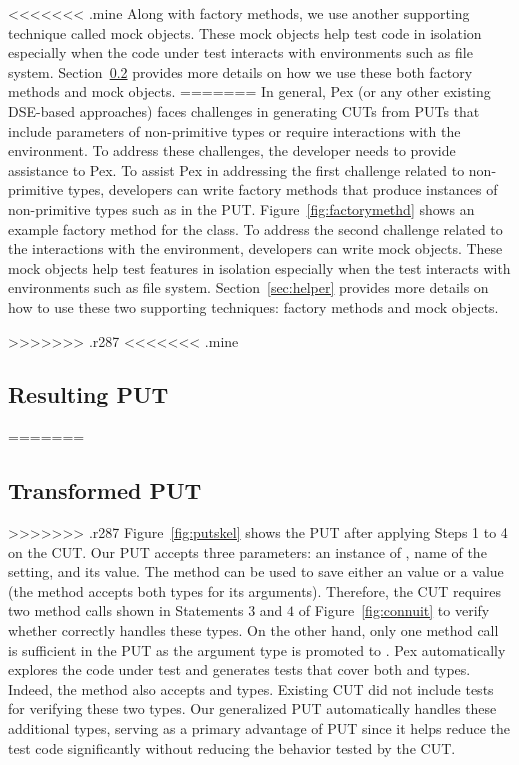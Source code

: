 <<<<<<< .mine
Along with factory methods, we use another supporting technique called mock objects. These mock objects help test code in isolation especially when the code under test interacts with environments such as file system. Section~\ref{} provides more details on how we use these both factory methods and mock objects.
=======
In general, Pex (or any other existing DSE-based approaches) faces challenges in generating CUTs from PUTs that include parameters of non-primitive types or require interactions with the environment. To address these challenges, the developer needs to provide assistance to Pex. To assist Pex in addressing the first challenge related to non-primitive types, developers can write factory methods that produce instances of non-primitive types such as  in the PUT. Figure~\ref{fig:factorymethd} shows an example factory method for the  class. To address the second challenge related to the interactions with the environment, developers can write mock objects. These mock objects help test features in isolation especially when the test interacts with environments such as file system. Section~\ref{sec:helper} provides more details on how to use these two supporting techniques: factory methods and mock objects.

>>>>>>> .r287
<<<<<<< .mine
\subsection{Resulting PUT}
=======
\subsection{Transformed PUT}

>>>>>>> .r287
Figure~\ref{fig:putskel} shows the PUT after applying Steps 1 to 4 on the CUT. Our PUT accepts three parameters: an instance of , name of the setting, and its value. The  method can be used to save either an  value or a  value (the method accepts both types for its arguments). Therefore, the CUT requires two method calls shown in Statements $3$ and $4$ of Figure~\ref{fig:connuit} to verify whether  correctly handles these types. On the other hand, only one method call is sufficient in the PUT as the argument type is promoted to . Pex automatically explores the code under test and generates tests that cover both  and  types. Indeed, the  method also accepts  and  types. Existing CUT did not include tests for verifying these two types. Our generalized PUT automatically handles these additional types, serving as a primary advantage of PUT since it helps reduce the test code significantly without reducing the behavior tested by the CUT.

